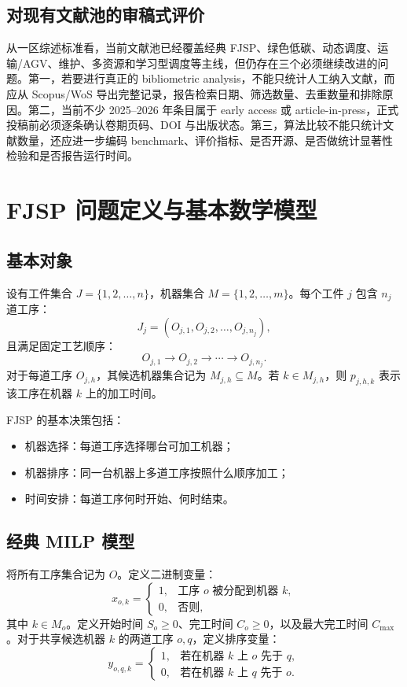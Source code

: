 \documentclass[UTF8,a4paper,11pt]{ctexart}
\newcommand{\Cmax}{C_{\max}}
\begin{document}
\subsection{对现有文献池的审稿式评价}

从一区综述标准看，当前文献池已经覆盖经典 FJSP、绿色低碳、动态调度、运输/AGV、维护、多资源和学习型调度等主线，但仍存在三个必须继续改进的问题。第一，若要进行真正的 bibliometric analysis，不能只统计人工纳入文献，而应从 Scopus/WoS 导出完整记录，报告检索日期、筛选数量、去重数量和排除原因。第二，当前不少 2025--2026 年条目属于 early access 或 article-in-press，正式投稿前必须逐条确认卷期页码、DOI 与出版状态。第三，算法比较不能只统计文献数量，还应进一步编码 benchmark、评价指标、是否开源、是否做统计显著性检验和是否报告运行时间。


\section{FJSP 问题定义与基本数学模型}

\subsection{基本对象}

设有工件集合 $J=\{1,2,\ldots,n\}$，机器集合 $M=\{1,2,\ldots,m\}$。每个工件 $j$ 包含 $n_j$ 道工序：
\[
J_j = \left(O_{j,1}, O_{j,2}, \ldots, O_{j,n_j}\right),
\]
且满足固定工艺顺序：
\[
O_{j,1}\rightarrow O_{j,2}\rightarrow \cdots \rightarrow O_{j,n_j}.
\]
对于每道工序 $O_{j,h}$，其候选机器集合记为 $M_{j,h}\subseteq M$。若 $k\in M_{j,h}$，则 $p_{j,h,k}$ 表示该工序在机器 $k$ 上的加工时间。

FJSP 的基本决策包括：
\begin{itemize}
    \item 机器选择：每道工序选择哪台可加工机器；
    \item 机器排序：同一台机器上多道工序按照什么顺序加工；
    \item 时间安排：每道工序何时开始、何时结束。
\end{itemize}

\subsection{经典 MILP 模型}

将所有工序集合记为 $O$。定义二进制变量：
\[
 x_{o,k}=\begin{cases}
1, & \text{工序 }o\text{ 被分配到机器 }k,\\
0, & \text{否则},
\end{cases}
\]
其中 $k\in M_o$。定义开始时间 $S_o\geq 0$、完工时间 $C_o\geq 0$，以及最大完工时间 $\Cmax$。对于共享候选机器 $k$ 的两道工序 $o,q$，定义排序变量：
\[
 y_{o,q,k}=\begin{cases}
1, & \text{若在机器 }k\text{ 上 }o\text{ 先于 }q,\\
0, & \text{若在机器 }k\text{ 上 }q\text{ 先于 }o.
\end{cases}
\]
\end{document}
